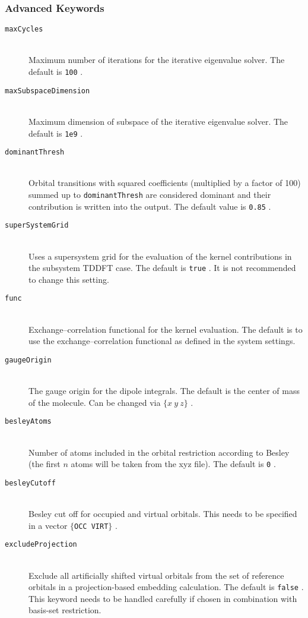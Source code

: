 \documentclass[bibliography=totocnumbered,a4paper,10pt,oneside]{scrbook}
\newcommand{\ttt}[1]{%
  \begingroup\setlength{\fboxsep}{1pt}%
  \colorbox{serenity-green!30}{\texttt{\hspace*{2pt}\vphantom{(g}#1\hspace*{2pt}}}%
  \endgroup
}
\begin{document}
\subsubsection{Advanced Keywords}
\begin{description}
    \item [\texttt{maxCycles}]\hfill \\
    Maximum number of iterations for the iterative eigenvalue solver. The default is \ttt{100}.
    \item [\texttt{maxSubspaceDimension}]\hfill \\
    Maximum dimension of subspace of the iterative eigenvalue solver. The default is \ttt{1e9}.
    \item [\texttt{dominantThresh}]\hfill \\
    Orbital transitions with squared coefficients (multiplied by a factor of 100) summed up to \ttt{dominantThresh} are considered dominant and their contribution is written into the output. The default value is \ttt{0.85}.
    \item [\texttt{superSystemGrid}]\hfill \\
    Uses a supersystem grid for the evaluation of the kernel contributions in the subsystem TDDFT case. The default is \ttt{true}. It is not recommended to change this setting.
    \item [\texttt{func}]\hfill \\
    Exchange--correlation functional for the kernel evaluation. The default is to use the exchange--correlation functional as defined in the system settings.
    \item [\texttt{gaugeOrigin}]\hfill \\
    The gauge origin for the dipole integrals. The default is the center of mass of the molecule. Can be changed via \ttt{$\{x~y~z\}$}.
    \item [\texttt{besleyAtoms}]\hfill \\
    Number of atoms included in the orbital restriction according to Besley (the first $n$ atoms will be taken from the xyz file). The default is \ttt{0}.
    \item [\texttt{besleyCutoff}]\hfill \\
    Besley cut off for occupied and virtual orbitals. This needs to be specified in a vector \ttt{$\{$OCC VIRT$\}$}.
    \item [\texttt{excludeProjection}]\hfill \\
    Exclude all artificially shifted virtual orbitals from the set of reference orbitals in a projection-based embedding calculation. The default is \ttt{false}. This keyword needs to be handled carefully if chosen in combination with basis-set restriction.

\end{description}
\end{document}
